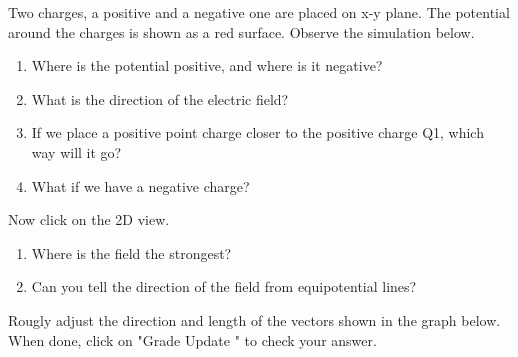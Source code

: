 \documentclass{ximera}
\begin{document}
\begin{example}
Two charges, a positive and a negative one are placed on x-y plane. The potential around the charges is shown as a red surface. Observe the simulation below. 

\begin{enumerate}
\item Where is the potential positive, and where is it negative? 
\item What is the direction of the electric field? 
\item If we place a positive point charge closer to the positive charge Q1, which way will it go?
\item What if we have a negative charge?
\end{enumerate}
Now click on the 2D view.
\begin{enumerate}
\item Where is the field the strongest? 
\item Can you tell the direction of the field from equipotential lines?
\end{enumerate}

\begin{center}  
\end{center} 

\end{example}


\begin{problem}
Rougly adjust the direction and length of the vectors shown in the graph below. When done, click on "Grade Update " to check your answer.

\begin{center}  
\end{center} 

\end{problem}
\end{document}
